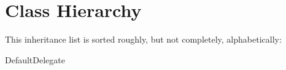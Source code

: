 \section{Class Hierarchy}
This inheritance list is sorted roughly, but not completely, alphabetically\+:\begin{DoxyCompactList}
\item Default\+Delegate\begin{DoxyCompactList}
\item {}
\end{DoxyCompactList}
\end{DoxyCompactList}
